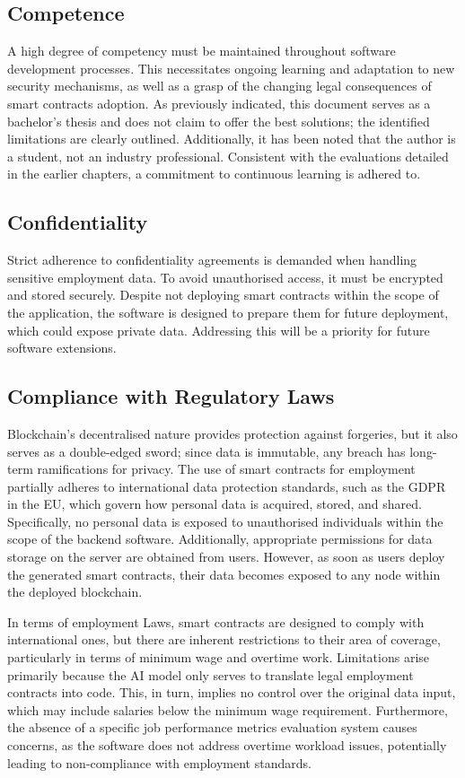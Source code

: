 \subsection{Competence}

A high degree of competency must be maintained throughout software development processes. This necessitates ongoing learning and adaptation to new security mechanisms, as well as a grasp of the changing legal consequences of smart contracts adoption. As previously indicated, this document serves as a bachelor's thesis and does not claim to offer the best solutions; the identified limitations are clearly outlined. Additionally, it has been noted that the author is a student, not an industry professional. Consistent with the evaluations detailed in the earlier chapters, a commitment to continuous learning is adhered to.

\subsection{Confidentiality}

Strict adherence to confidentiality agreements is demanded when handling sensitive employment data. To avoid unauthorised access, it must be encrypted and stored securely. Despite not deploying smart contracts within the scope of the application, the software is designed to prepare them for future deployment, which could expose private data. Addressing this will be a priority for future software extensions.

\subsection{Compliance with Regulatory Laws}

Blockchain's decentralised nature provides protection against forgeries, but it also serves as a double-edged sword; since data is immutable, any breach has long-term ramifications for privacy. The use of smart contracts for employment partially adheres to international data protection standards, such as the GDPR in the EU, which govern how personal data is acquired, stored, and shared. Specifically, no personal data is exposed to unauthorised individuals within the scope of the backend software. Additionally, appropriate permissions for data storage on the server are obtained from users. However, as soon as users deploy the generated smart contracts, their data becomes exposed to any node within the deployed blockchain. 
    
In terms of employment Laws, smart contracts are designed to comply with international ones, but there are inherent restrictions to their area of coverage, particularly in terms of minimum wage and overtime work. Limitations arise primarily because the AI model only serves to translate legal employment contracts into code. This, in turn, implies no control over the original data input, which may include salaries below the minimum wage requirement. Furthermore, the absence of a specific job performance metrics evaluation system causes concerns, as the software does not address overtime workload issues, potentially leading to non-compliance with employment standards.
    

